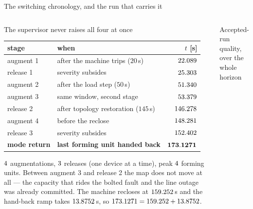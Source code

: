 \documentclass[aspectratio=169,10pt]{beamer}
\begin{document}
\begin{frame}[shrink=6]{The switching chronology, and the run that carries it}
\begin{columns}[T,onlytextwidth]
\begin{block}{The supervisor never raises all four at once}
\footnotesize
\vspace{-0.35em}\begin{center}\footnotesize\setlength{\tabcolsep}{4pt}
\begin{tabular}{llr}\toprule
stage & when & $t$ [s] \\ \midrule
augment 1 & after the machine trips ($20$\,s) & $22.089$ \\
release 1 & severity subsides & $25.303$ \\
augment 2 & after the load step ($50$\,s) & $51.340$ \\
augment 3 & same window, second stage & $53.379$ \\
release 2 & after topology restoration ($145$\,s) & $146.278$ \\
augment 4 & before the reclose & $148.281$ \\
release 3 & severity subsides & $152.402$ \\
\textbf{mode return} & \textbf{last forming unit handed back} & $\mathbf{173.1271}$ \\
\bottomrule\end{tabular}
\end{center}\vspace{-0.35em}
$4$ augmentations, $3$ releases (one device at a
time), peak $4$ forming units. Between augment 3 and release 2 the
map does not move at all --- the capacity that rides the bolted fault and the
line outage was already committed. The machine recloses at $159.252$\,s
and the hand-back ramp takes $13.8752$\,s, so
$173.1271=159.252+13.8752$.
\end{block}
\begin{block}{Accepted-run quality, over the whole horizon}
\footnotesize
\vspace{-0.35em}\begin{center}\footnotesize\setlength{\tabcolsep}{4pt}

\end{center}
\end{block}
\end{columns}
\end{frame}
\end{document}
